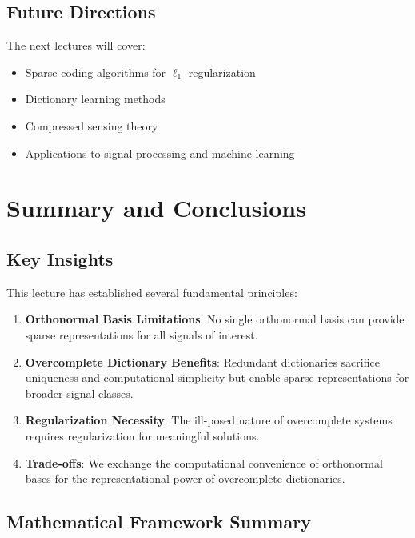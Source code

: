 \documentclass[12pt]{article}
\theoremstyle{definition}
\begin{document}
\subsection{Future Directions}

The next lectures will cover:
\begin{itemize}
    \item Sparse coding algorithms for $\ell_1$ regularization
    \item Dictionary learning methods
    \item Compressed sensing theory
    \item Applications to signal processing and machine learning
\end{itemize}

\newpage

\section{Summary and Conclusions}

\subsection{Key Insights}

This lecture has established several fundamental principles:

\begin{enumerate}
    \item \textbf{Orthonormal Basis Limitations}: No single orthonormal basis can provide sparse representations for all signals of interest.

    \item \textbf{Overcomplete Dictionary Benefits}: Redundant dictionaries sacrifice uniqueness and computational simplicity but enable sparse representations for broader signal classes.

    \item \textbf{Regularization Necessity}: The ill-posed nature of overcomplete systems requires regularization for meaningful solutions.

    \item \textbf{Trade-offs}: We exchange the computational convenience of orthonormal bases for the representational power of overcomplete dictionaries.
\end{enumerate}

\subsection{Mathematical Framework Summary}
\end{document}
